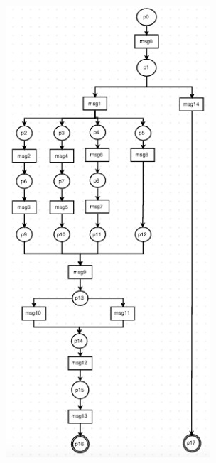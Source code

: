\documentclass[conference]{IEEEtran}
\begin{document}
 \begin{figure} 
 \centerline{
 \includegraphics[width=3in]{figures/Fih6.png}}
 

\end{figure}
\end{document}
